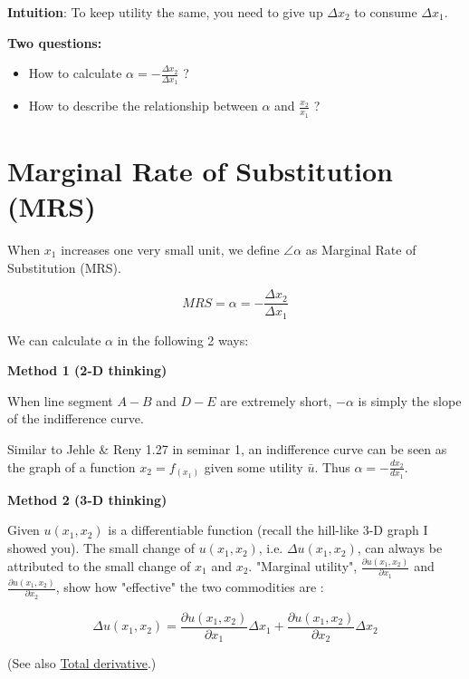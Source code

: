 \documentclass{article}
\begin{document}
\begin{mdframed}[backgroundcolor=blue!20,linecolor=white]
\textbf{Intuition}: To keep utility the same, you need to give up $\Delta x_2$ to consume $\Delta x_1$. 

\vspace{4mm}

\textbf{Two questions:}

\begin{itemize}
\item How to calculate $\alpha = - \frac{\Delta x_2}{\Delta x_1}$ ?
\item How to describe the relationship between $\alpha$ and $\frac{x_2}{x_1}$ ?
\end{itemize}

\section{Marginal Rate of Substitution (MRS)}

When $x_1$ increases one very small unit, we define $\angle \alpha$ as Marginal Rate of Substitution (MRS). 

$$MRS = \alpha = - \frac{\Delta x_2}{\Delta x_1}$$

We can calculate $\alpha$  in the following 2 ways:

\vspace{4mm}

\textbf{Method 1 (2-D thinking)}

When line segment $A-B$ and $D-E$ are extremely short, $- \alpha$ is simply the slope of the indifference curve.

Similar to Jehle \& Reny 1.27 in seminar 1, an indifference curve can be seen as the graph of a function $x_2 = f_(x_1)$ given some utility $\bar{u}$. Thus $\alpha = - \frac{dx_2}{dx_1}$.

\vspace{2mm}

\textbf{Method 2 (3-D thinking)}

Given $u(x_1,x_2)$ is a differentiable function (recall the hill-like 3-D graph I showed you). The small change of $u(x_1,x_2)$, i.e. $\Delta u(x_1,x_2)$, can always be attributed to the small change of $x_1$ and  $x_2$. "Marginal utility", $\frac{\partial u(x_1,x_2)}{\partial x_1}$ and $\frac{\partial u(x_1,x_2)}{\partial x_2}$, show how "effective" the two commodities are :

$$\Delta u(x_1,x_2) = \frac{\partial u(x_1,x_2)}{\partial x_1} \Delta x_1 + \frac{\partial u(x_1,x_2)}{\partial x_2} \Delta x_2$$

(See also \href{https://en.wikipedia.org/wiki/Total_derivative}{Total derivative}.)


\end{mdframed}
\end{document}
